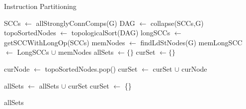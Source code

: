 \documentclass{sig-alternate}
\begin{document}
\begin{algorithm}[t]
  \caption{Instruction Partitioning}\label{algo1}
  \begin{algorithmic}[1]
    \State SCCs $\gets$ allStronglyConnComps(G)
  \State DAG $\gets$ collapse(SCCs,G)
  \State topoSortedNodes $\gets$ topologicalSort(DAG)
  \State longSCCs $\gets$ getSCCWithLongOp(SCCs)
  \State memNodes $\gets$ findLdStNodes(G)
  \State memLongSCC $\gets$ LongSCCs $\cup$ memNodes
  \State allSets $\gets \{\}$
  \State curSet $\gets \{\}$

     \State curNode $\gets$ topoSortedNodes.pop()
     \State curSet $\gets$ curSet $\cup$ curNode
    
    \State allSets $\gets$ allSets $\cup$ curSet
    \State curSet $\gets$ \{\}
     \EndIf

     
  \EndWhile
  \State \Return allSets 
  
    \EndProcedure
  

\end{algorithmic}
\end{algorithm}
\end{document}
